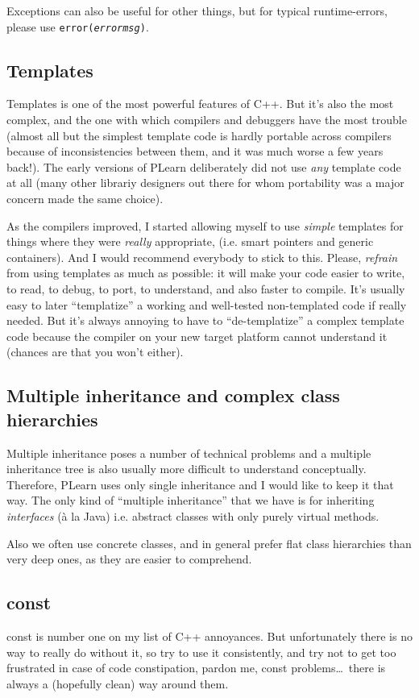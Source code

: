 \documentclass[11pt]{book}
\begin{document}
 Exceptions can also be useful for other things, but for typical
runtime-errors, please use {\tt error(\emph{errormsg})}.

\subsection*{Templates}
 Templates is one of the most powerful features of C++. But it's also
the most complex, and the one with which compilers and debuggers
have the most trouble (almost all but the simplest template code is
hardly portable across compilers because of inconsistencies between
them, and it was much worse a few years back!). The early versions
of PLearn deliberately did not use \emph{any} template code at all
(many other librariy designers out there for whom portability was a
major concern made the same choice).

 As the compilers improved, I started allowing myself to use
\emph{simple} templates for things where they were \emph{really}
appropriate, (i.e. smart pointers and generic containers). And I
would recommend everybody to stick to this. Please, \emph{refrain}
from using templates as much as possible: it will make your code
easier to write, to read, to debug, to port, to understand, and
also faster to compile. It's usually easy to later ``templatize'' a
working and well-tested non-templated code if really needed. But it's
always annoying to have to ``de-templatize'' a complex template code
because the compiler on your new target platform cannot understand it
(chances are that you won't either).

\subsection*{Multiple inheritance and complex class hierarchies}
 Multiple inheritance poses a number of technical problems and a multiple
inheritance tree is also usually more difficult to understand
conceptually. Therefore, PLearn uses only single inheritance and I would
like to keep it that way. The only kind of ``multiple inheritance'' that we
have is for inheriting \emph{interfaces } (\`a la Java) i.e. abstract
classes with only purely virtual methods.

Also we often use concrete classes, and in general prefer flat class
hierarchies than very deep ones, as they are easier to comprehend.


\subsection*{const}
 const is number one on my list of C++ annoyances. But unfortunately
there is no way to really do without it, so try to use it consistently,
and try not to get too frustrated in case of code constipation,
pardon me, const problems\ldots\ there is always a (hopefully clean)
way around them.
\end{document}
